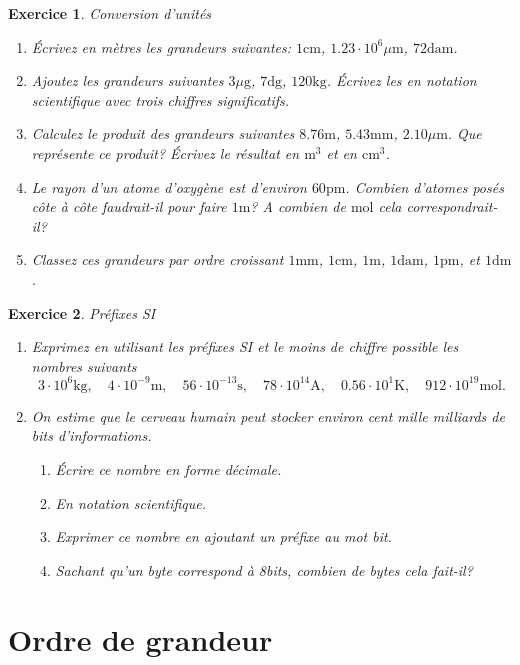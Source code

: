 \documentclass[a4paper,12pt]{book}
\newtheorem{exercice}{Exercice}
\newcommand{\cm}{\mathrm{cm}}
\newcommand{\mm}{\mathrm{mm}}
\newcommand{\mol}{\mathrm{mol}}
\newcommand{\m}{\mathrm{m}}
\newcommand{\s}{\mathrm{s}}
\newcommand{\kg}{\mathrm{kg}}
\newcommand{\g}{\mathrm{g}}
\begin{document}
\begin{exercice}{Conversion d'unités}

\begin{enumerate}
\item Écrivez en mètres les grandeurs suivantes: $1\cm$, $1.23\cdot 10^6\mu\m$, $72\mathrm{da}\m$.
\item Ajoutez les grandeurs suivantes $3\mu\g$, $7\mathrm{d}\g$, $120\kg$. Écrivez les en notation scientifique avec 
trois chiffres significatifs.
\item Calculez le produit des grandeurs suivantes $8.76\m$, $5.43\mm$, $2.10\mu\m$. Que représente ce produit?
Écrivez le résultat en $\m^3$ et en $\cm^3$.
\item Le rayon d'un atome d'oxygène est d'environ $60\mathrm{pm}$. Combien d'atomes posés côte à côte faudrait-il
pour faire $1\m$? A combien de $\mol$ cela correspondrait-il?
\item Classez ces grandeurs par ordre croissant $1\mm$, $1\cm$, $1\m$, $1\mathrm{dam}$, $1\mathrm{pm}$, et $1\mathrm{dm}$.
\end{enumerate}
\end{exercice}

\begin{exercice}{Préfixes SI}

\begin{enumerate}
\item Exprimez en utilisant les préfixes SI et le moins de chiffre possible les nombres suivants
\begin{equation*}
3\cdot 10^6\kg,\quad 4\cdot10^{-9}\m,\quad 56\cdot10^{-13}\s,\quad 78\cdot 10^{14} \mathrm{A},\quad 0.56\cdot 10^1 \mathrm{K} ,\quad 912\cdot10^{19}\mol.
\end{equation*}
\item On estime que le cerveau humain peut stocker environ cent mille milliards de bits d’informations.
\begin{enumerate}
	\item Écrire ce nombre en forme décimale.
	\item En notation scientifique.
	\item Exprimer ce nombre en ajoutant un préfixe au mot bit.
	\item Sachant qu'un byte correspond à 8bits, combien de bytes cela fait-il?
\end{enumerate}
\end{enumerate}
\end{exercice}


\section{Ordre de grandeur}
\end{document}
